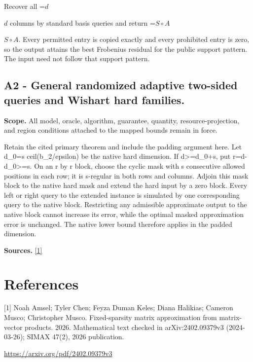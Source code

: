 \documentclass[10pt,a4paper]{article}
\newcommand{\AtlasMath}[1]{\par\begingroup\centering\setbox0=\hbox{$\displaystyle #1$}\ifdim\wd0>1.4\linewidth\typeout{ATLAS WIDE FORMULA: \the\wd0}\fi\ifdim\wd0>\linewidth\resizebox{\linewidth}{!}{\box0}\else\box0\fi\par\endgroup}
\newcommand{\AtlasInlineMath}[1]{\begingroup\setbox0=\hbox{$#1$}\ifdim\wd0>.4\linewidth\endgroup\AtlasMath{#1}\else\endgroup$#1$\fi}
\begin{document}
Recover all \AtlasInlineMath{d} columns by standard basis queries and return \AtlasInlineMath{S\circ A}. Every permitted entry is copied exactly and every prohibited entry is zero, so the output attains the best Frobenius residual for the public support pattern. The input need not follow that support pattern.

\subsection{A2 - General randomized adaptive two-sided queries and Wishart hard families.}
\textbf{Scope.} All model, oracle, algorithm, guarantee, quantity, resource-projection, and region conditions attached to the mapped bounds remain in force.

Retain the cited primary theorem and include the padding argument here. Let d\_0=s ceil(b\_2/epsilon) be the native hard dimension. If d>=d\_0+s, put r=d-d\_0>=s. On an r by r block, choose the cyclic mask with s consecutive allowed positions in each row; it is s-regular in both rows and columns. Adjoin this mask block to the native hard mask and extend the hard input by a zero block. Every left or right query to the extended instance is simulated by one corresponding query to the native block. Restricting any admissible approximate output to the native block cannot increase its error, while the optimal masked approximation error is unchanged. The native lower bound therefore applies in the padded dimension.

\textbf{Sources.} \href{https://arxiv.org/pdf/2402.09379v3}{[1]}

\section{References}
[1] Noah Amsel; Tyler Chen; Feyza Duman Keles; Diana Halikias; Cameron Musco; Christopher Musco. Fixed-sparsity matrix approximation from matrix-vector products. 2026. Mathematical text checked in arXiv:2402.09379v3 (2024-03-26); SIMAX 47(2), 2026 publication.

\url{https://arxiv.org/pdf/2402.09379v3}
\end{document}
